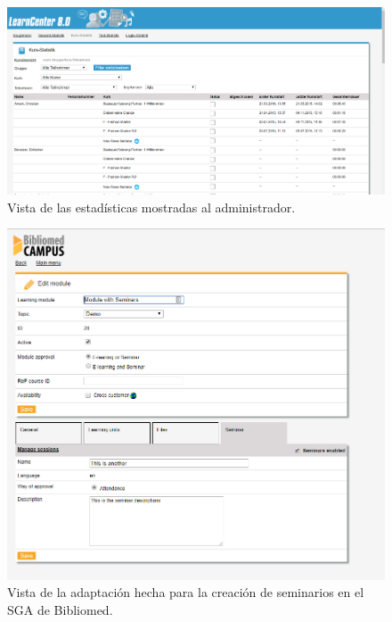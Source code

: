 \begin{figure}[h]
	\begin{center}
		\includegraphics[width=\textwidth]{screenshots/estadisticas.png}
		\caption{Vista de las estadísticas mostradas al administrador.} \label{fig:estadisticasAdmin}
	\end{center}
\end{figure}

\begin{figure}[h]
	\begin{center}
		\includegraphics[width=\textwidth]{screenshots/bibliomed_adaptacion.png}
		\caption{Vista de la adaptación hecha para la creación de seminarios en el SGA de Bibliomed.} \label{fig:creacionSeminarioBibliomed}
	\end{center}
\end{figure}

